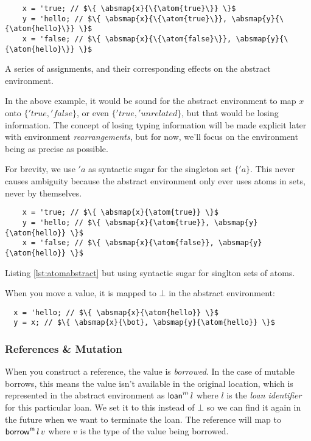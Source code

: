 \documentclass[12pt,twoside]{report}
\begin{document}
\begin{listing}[H]
  \begin{verbatim}
    x = 'true; // $\{ \absmap{x}{\{\atom{true}\}} \}$
    y = 'hello; // $\{ \absmap{x}{\{\atom{true}\}}, \absmap{y}{\{\atom{hello}\}} \}$
    x = 'false; // $\{ \absmap{x}{\{\atom{false}\}}, \absmap{y}{\{\atom{hello}\}} \}$
  \end{verbatim}
  \caption{A series of assignments, and their corresponding effects on the abstract environment.}
  \label{lst:atomabstract}
\end{listing}

In the above example, it would be sound for the abstract environment to map $x$ onto $\{'true, 'false\}$, or even $\{'true, 'unrelated\}$, but that would be losing information. The concept of losing typing information will be made explicit later with environment \textit{rearrangements}, but for now, we'll focus on the environment being as precise as possible.

For brevity, we use $'a$ as syntactic sugar for the singleton set $\{'a\}$. This never causes ambiguity because the abstract environment only ever uses atoms in sets, never by themselves.

\begin{listing}[H]
  \begin{verbatim}
    x = 'true; // $\{ \absmap{x}{\atom{true}} \}$
    y = 'hello; // $\{ \absmap{x}{\atom{true}}, \absmap{y}{\atom{hello}} \}$
    x = 'false; // $\{ \absmap{x}{\atom{false}}, \absmap{y}{\atom{hello}} \}$
  \end{verbatim}
  \caption{Listing \ref{lst:atomabstract} but using syntactic sugar for singlton sets of atoms.}
\end{listing}

When you move a value, it is mapped to $\bot$ in the abstract environment:

\begin{verbatim}
  x = 'hello; // $\{ \absmap{x}{\atom{hello}} \}$
  y = x; // $\{ \absmap{x}{\bot}, \absmap{y}{\atom{hello}} \}$
\end{verbatim}

\subsubsection{References \& Mutation}

When you construct a reference, the value is \textit{borrowed}. In the case of mutable borrows, this means the value isn't available in the original location, which is represented in the abstract environment as $\mathsf{loan}^m \, l$ where $l$ is the \textit{loan identifier} for this particular loan. We set it to this instead of $\bot$ so we can find it again in the future when we want to terminate the loan. The reference will map to $\mathsf{borrow}^{\mathsf{m}}\,l\,v$ where $v$ is the type of the value being borrowed.
\end{document}
